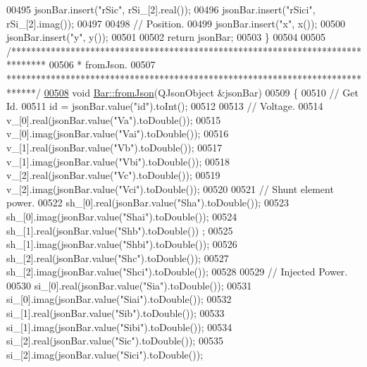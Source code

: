 \begin{DoxyCode}
00495   jsonBar.insert(\textcolor{stringliteral}{"rSic"}, rSi\_[2].real());
00496   jsonBar.insert(\textcolor{stringliteral}{"rSici"}, rSi\_[2].imag());
00497 
00498   \textcolor{comment}{// Position.}
00499   jsonBar.insert(\textcolor{stringliteral}{"x"}, x());
00500   jsonBar.insert(\textcolor{stringliteral}{"y"}, y());
00501 
00502   \textcolor{keywordflow}{return} jsonBar;
00503 \}
00504 
00505 \textcolor{comment}{/*******************************************************************************}
00506 \textcolor{comment}{ * fromJson.}
00507 \textcolor{comment}{ ******************************************************************************/}
\hypertarget{bar_8cpp_source_l00508}{}\hyperlink{group___models_ga1df62f03dd3a066ceaf6588ba6bb6004}{00508} \textcolor{keywordtype}{void} \hyperlink{group___models_ga1df62f03dd3a066ceaf6588ba6bb6004}{Bar::fromJson}(QJsonObject &jsonBar)
00509 \{
00510   \textcolor{comment}{// Get Id.}
00511   \textcolor{keywordtype}{id} = jsonBar.value(\textcolor{stringliteral}{"id"}).toInt();
00512 
00513   \textcolor{comment}{// Voltage.}
00514   v\_[0].real(jsonBar.value(\textcolor{stringliteral}{"Va"}).toDouble());
00515   v\_[0].imag(jsonBar.value(\textcolor{stringliteral}{"Vai"}).toDouble());
00516   v\_[1].real(jsonBar.value(\textcolor{stringliteral}{"Vb"}).toDouble());
00517   v\_[1].imag(jsonBar.value(\textcolor{stringliteral}{"Vbi"}).toDouble());
00518   v\_[2].real(jsonBar.value(\textcolor{stringliteral}{"Vc"}).toDouble());
00519   v\_[2].imag(jsonBar.value(\textcolor{stringliteral}{"Vci"}).toDouble());
00520 
00521   \textcolor{comment}{// Shunt element power.}
00522   sh\_[0].real(jsonBar.value(\textcolor{stringliteral}{"Sha"}).toDouble());
00523   sh\_[0].imag(jsonBar.value(\textcolor{stringliteral}{"Shai"}).toDouble());
00524   sh\_[1].real(jsonBar.value(\textcolor{stringliteral}{"Shb"}).toDouble()) ;
00525   sh\_[1].imag(jsonBar.value(\textcolor{stringliteral}{"Shbi"}).toDouble());
00526   sh\_[2].real(jsonBar.value(\textcolor{stringliteral}{"Shc"}).toDouble());
00527   sh\_[2].imag(jsonBar.value(\textcolor{stringliteral}{"Shci"}).toDouble());
00528 
00529   \textcolor{comment}{// Injected Power.}
00530   si\_[0].real(jsonBar.value(\textcolor{stringliteral}{"Sia"}).toDouble());
00531   si\_[0].imag(jsonBar.value(\textcolor{stringliteral}{"Siai"}).toDouble());
00532   si\_[1].real(jsonBar.value(\textcolor{stringliteral}{"Sib"}).toDouble());
00533   si\_[1].imag(jsonBar.value(\textcolor{stringliteral}{"Sibi"}).toDouble());
00534   si\_[2].real(jsonBar.value(\textcolor{stringliteral}{"Sic"}).toDouble());
00535   si\_[2].imag(jsonBar.value(\textcolor{stringliteral}{"Sici"}).toDouble());

\end{DoxyCode}
